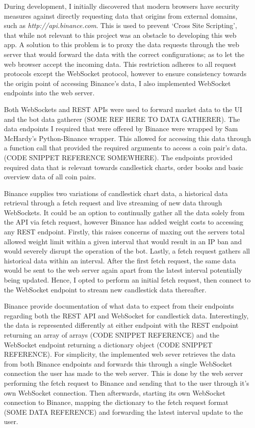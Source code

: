 \noindent During development, I initially discovered that modern browsers have security measures against directly requesting data that origins from external domains, such as \textit{http://api.binance.com}. This is used to prevent `Cross Site Scripting', that while not relevant to this project was an obstacle to developing this web app. A solution to this problem is to proxy the data requests through the web server that would forward the data with the correct configurations; as to let the web browser accept the incoming data. This restriction adheres to all request protocols except the WebSocket protocol, however to ensure consistency towards the origin point of accessing Binance's data, I also implemented WebSocket endpoints into the web server.

Both WebSockets and REST APIs were used to forward market data to the UI and the bot data gatherer (SOME REF HERE TO DATA GATHERER). The data endpoints I required that were offered by Binance were wrapped by Sam McHardy's \cite{MISC:Python-Binance} Python-Binance wrapper. This allowed for accessing this data through a function call that provided the required arguments to access a coin pair's data. (CODE SNIPPET REFERENCE SOMEWHERE).  The endpoints provided required data that is relevant towards candlestick charts, order books and basic overview data of all coin pairs.

Binance supplies two variations of candlestick chart data, a historical data retrieval through a fetch request and live streaming of new data through WebSockets. It could be an option to continually gather all the data solely from the API via fetch request, however Binance has added weight costs to accessing any REST endpoint. Firstly, this raises concerns of maxing out the servers total allowed weight limit within a given interval that would result in an IP ban and would severely disrupt the operation of the bot. Lastly, a fetch request gathers all historical data within an interval. After the first fetch request, the same data would be sent to the web server again apart from the latest interval potentially being updated. Hence, I opted to perform an initial fetch request, then connect to the WebSocket endpoint to stream new candlestick data thereafter. 

Binance provide documentation of what data to expect from their endpoints regarding both the REST API and WebSocket for candlestick data. Interestingly, the data is represented differently at either endpoint with the REST endpoint returning an array of arrays (CODE SNIPPET REFERENCE) and the WebSocket endpoint returning a dictionary object (CODE SNIPPET REFERENCE). %
For simplicity, the implemented web sever retrieves the data from both Binance endpoints and forwards this through a single WebSocket connection the user has made to the web server. This is done by the web server performing the fetch request to Binance and sending that to the user through it's own WebSocket connection. Then afterwards, starting its own WebSocket connection to Binance, mapping the dictionary to the fetch request format (SOME DATA REFERENCE) and forwarding the latest interval update to the user.

